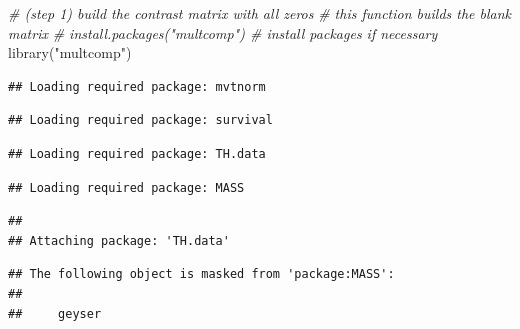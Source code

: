 \documentclass[
  10pt,
]{book}
\newenvironment{Shaded}{\begin{snugshade}}{\end{snugshade}}
\newcommand{\CommentTok}[1]{\textcolor[rgb]{0.56,0.35,0.01}{\textit{#1}}}
\newcommand{\FunctionTok}[1]{\textcolor[rgb]{0.00,0.00,0.00}{#1}}
\newcommand{\NormalTok}[1]{#1}
\newcommand{\StringTok}[1]{\textcolor[rgb]{0.31,0.60,0.02}{#1}}
\begin{document}
\begin{Shaded}
\begin{Highlighting}[]
\CommentTok{\# (step 1) build the contrast matrix with all zeros}
\CommentTok{\# this function builds the blank matrix }
\CommentTok{\# install.packages("multcomp") \# install packages if necessary}
\FunctionTok{library}\NormalTok{(}\StringTok{"multcomp"}\NormalTok{)}
\end{Highlighting}
\end{Shaded}

\begin{verbatim}
## Loading required package: mvtnorm
\end{verbatim}

\begin{verbatim}
## Loading required package: survival
\end{verbatim}

\begin{verbatim}
## Loading required package: TH.data
\end{verbatim}

\begin{verbatim}
## Loading required package: MASS
\end{verbatim}

\begin{verbatim}
## 
## Attaching package: 'TH.data'
\end{verbatim}

\begin{verbatim}
## The following object is masked from 'package:MASS':
## 
##     geyser
\end{verbatim}
\end{document}
